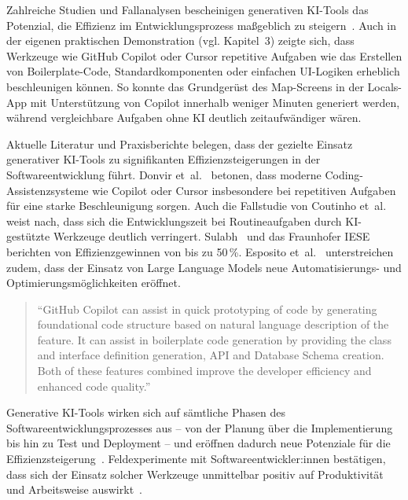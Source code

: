 Zahlreiche Studien und Fallanalysen bescheinigen generativen KI-Tools das
Potenzial, die Effizienz im Entwicklungsprozess maßgeblich zu
steigern~\cite{donvir_role_2024,coutinho_role_2024,s_future_2024,esposito_generative_2025,braun_ki_2024,siebert_generative_2024}.
Auch in der eigenen praktischen Demonstration (vgl. Kapitel~3) zeigte sich,
dass Werkzeuge wie GitHub Copilot oder Cursor repetitive Aufgaben wie das
Erstellen von Boilerplate-Code, Standardkomponenten oder einfachen UI-Logiken
erheblich beschleunigen können. So konnte das Grundgerüst des Map-Screens in
der Locals-App mit Unterstützung von Copilot innerhalb weniger Minuten
generiert werden, während vergleichbare Aufgaben ohne KI deutlich
zeitaufwändiger wären.

Aktuelle Literatur und Praxisberichte belegen, dass der gezielte Einsatz
generativer KI-Tools zu signifikanten Effizienzsteigerungen in der
Softwareentwicklung führt. Donvir et~al.~\cite{donvir_role_2024} betonen, dass
moderne Coding-Assistenzsysteme wie Copilot oder Cursor insbesondere bei
repetitiven Aufgaben für eine starke Beschleunigung sorgen. Auch die Fallstudie
von Coutinho et~al.~\cite{coutinho_role_2024} weist nach, dass sich die
Entwicklungszeit bei Routineaufgaben durch KI-gestützte Werkzeuge deutlich
verringert. Sulabh~\cite{s_future_2024} und das Fraunhofer
IESE~\cite{siebert_generative_2024} berichten von Effizienzgewinnen von bis zu
50\,\%. Esposito et~al.~\cite{esposito_generative_2025} unterstreichen zudem,
dass der Einsatz von Large Language Models neue Automatisierungs- und
Optimierungsmöglichkeiten eröffnet.

\begin{quote}
    \enquote{GitHub Copilot can assist in quick prototyping of code by generating foundational code structure based on natural language description of the feature. It can assist in boilerplate code generation by providing the class and interface definition generation, API and Database Schema creation. Both of these features combined improve the developer efficiency and enhanced code quality.}
    \cite[S.~4]{donvir_role_2024}
\end{quote}

Generative KI-Tools wirken sich auf sämtliche Phasen des
Softwareentwicklungsprozesses aus – von der Planung über die Implementierung
bis hin zu Test und Deployment – und eröffnen dadurch neue Potenziale für die
Effizienzsteigerung~\cite{minikiewicz_impact_nodate}. Feldexperimente mit
Softwareentwickler:innen bestätigen, dass sich der Einsatz solcher Werkzeuge
unmittelbar positiv auf Produktivität und Arbeitsweise
auswirkt~\cite{cui_effects_2024}.

